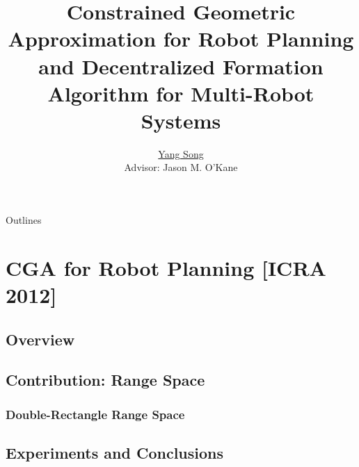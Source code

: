 \documentclass[10pt]{beamer}
\title[Ph.D. Defense]{Constrained Geometric Approximation for Robot Planning and  Decentralized Formation Algorithm for Multi-Robot Systems}
\author[Yang Song]{
  \underline{Yang Song}\\
  Advisor: Jason M. O'Kane
}
\institute[
USC
] %
{ %
  Dept. of Computer Science and Engineering\\
  University of South Carolina
  
}
\begin{document}
\begin{frame}
  \titlepage
\end{frame}
\begin{frame}{Outlines}{}
\tableofcontents
\end{frame}

\section{CGA for Robot Planning [ICRA 2012]}
\subsection[Overview]{Overview}








%
%



\subsection[Range Space]{Contribution: Range Space}







\subsubsection[Algorithm1]{Double-Rectangle Range Space}








\subsection[Experiments]{Experiments and Conclusions}
% 
% 
% 
% 
% 
% 


\end{document}
